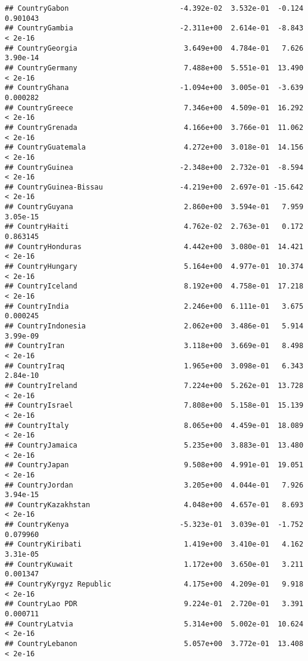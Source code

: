 \documentclass[
]{article}
\begin{document}
\begin{verbatim}
## CountryGabon                          -4.392e-02  3.532e-01  -0.124 0.901043
## CountryGambia                         -2.311e+00  2.614e-01  -8.843  < 2e-16
## CountryGeorgia                         3.649e+00  4.784e-01   7.626 3.90e-14
## CountryGermany                         7.488e+00  5.551e-01  13.490  < 2e-16
## CountryGhana                          -1.094e+00  3.005e-01  -3.639 0.000282
## CountryGreece                          7.346e+00  4.509e-01  16.292  < 2e-16
## CountryGrenada                         4.166e+00  3.766e-01  11.062  < 2e-16
## CountryGuatemala                       4.272e+00  3.018e-01  14.156  < 2e-16
## CountryGuinea                         -2.348e+00  2.732e-01  -8.594  < 2e-16
## CountryGuinea-Bissau                  -4.219e+00  2.697e-01 -15.642  < 2e-16
## CountryGuyana                          2.860e+00  3.594e-01   7.959 3.05e-15
## CountryHaiti                           4.762e-02  2.763e-01   0.172 0.863145
## CountryHonduras                        4.442e+00  3.080e-01  14.421  < 2e-16
## CountryHungary                         5.164e+00  4.977e-01  10.374  < 2e-16
## CountryIceland                         8.192e+00  4.758e-01  17.218  < 2e-16
## CountryIndia                           2.246e+00  6.111e-01   3.675 0.000245
## CountryIndonesia                       2.062e+00  3.486e-01   5.914 3.99e-09
## CountryIran                            3.118e+00  3.669e-01   8.498  < 2e-16
## CountryIraq                            1.965e+00  3.098e-01   6.343 2.84e-10
## CountryIreland                         7.224e+00  5.262e-01  13.728  < 2e-16
## CountryIsrael                          7.808e+00  5.158e-01  15.139  < 2e-16
## CountryItaly                           8.065e+00  4.459e-01  18.089  < 2e-16
## CountryJamaica                         5.235e+00  3.883e-01  13.480  < 2e-16
## CountryJapan                           9.508e+00  4.991e-01  19.051  < 2e-16
## CountryJordan                          3.205e+00  4.044e-01   7.926 3.94e-15
## CountryKazakhstan                      4.048e+00  4.657e-01   8.693  < 2e-16
## CountryKenya                          -5.323e-01  3.039e-01  -1.752 0.079960
## CountryKiribati                        1.419e+00  3.410e-01   4.162 3.31e-05
## CountryKuwait                          1.172e+00  3.650e-01   3.211 0.001347
## CountryKyrgyz Republic                 4.175e+00  4.209e-01   9.918  < 2e-16
## CountryLao PDR                         9.224e-01  2.720e-01   3.391 0.000711
## CountryLatvia                          5.314e+00  5.002e-01  10.624  < 2e-16
## CountryLebanon                         5.057e+00  3.772e-01  13.408  < 2e-16

\end{verbatim}
\end{document}
